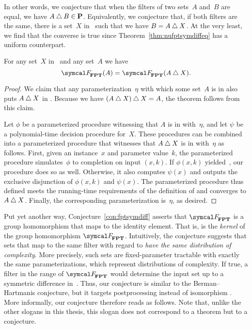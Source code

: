 In other words, we conjecture that when the filters of two sets~$A$ and~$B$ are equal, we have $A \bigtriangleup B \in \textnormal{\textbf{P}}$.
Equivalently, we conjecture that, if both filters are the same, there is  a set~$X$ in~ such that we have $B = A \bigtriangleup X$.
At the very least, we find that the converse is true since Theorem~\ref{thm:nufptsymdiffeq} has a uniform counterpart.
\begin{theorem}
  For any set~$X$ in~ and any set~$A$ we have
  \begin{equation*}
    \calF_\cl{FPT}(A) = \calF_\cl{FPT}(A \symdiff X).
  \end{equation*}
\end{theorem}
\begin{proof}
  We claim that any parameterization~$\eta$ with which some set~$A$ is in  also puts $A \bigtriangleup X$ in .
  Because we have $(A \bigtriangleup X) \bigtriangleup X = A$, the theorem follows from this claim.

  Let $\phi$ be a parameterized procedure witnessing that $A$ is in  with~$\eta$, and let $\psi$ be a polynomial-time decision procedure for~$X$.
  These procedures can be combined into a parameterized procedure that witnesses that $A \bigtriangleup X$ is in  with~$\eta$ as follows.
  First, given an instance~$x$ and parameter value~$k$, the parameterized procedure simulates~$\phi$ to completion on input $(x, k)$.
  If $\phi(x, k)$ yielded~, our procedure does so as well.
  Otherwise, it also computes $\psi(x)$ and outputs the exclusive disjunction of $\phi(x, k)$ and $\psi(x)$.
  The parameterized procedure thus defined meets the running-time requirements of the definition of  and converges to $A \bigtriangleup X$.
  Finally, the corresponding parameterization is~$\eta$, as desired.
\end{proof}

Put yet another way, Conjecture~\ref{con:fptsymdiff} asserts that $\calF_\cl{FPT}$ is a group homomorphism that maps  to the identity element.
That is,  is the \emph{kernel} of the group homomorphism $\calF_\cl{FPT}$.
Intuitively, the conjecture suggests that sets that map to the same filter with regard to  \emph{have the same distribution of complexity}.
More precisely, such sets are fixed-parameter tractable with exactly the same parameterizations, which represent distributions of complexity.
If true, a filter in the range of $\calF_\cl{FPT}$ would determine the input set up to a symmetric difference in~.
Thus, our conjecture is similar to the Berman--Hartmanis conjecture, but it targets postprocessing instead of isomorphism \parencite[see also][]{agrawal2009one}.
More informally, our conjecture therefore reads as follows.
Note that, unlike the other slogans in this thesis, this slogan does not correspond to a theorem but to a conjecture.

